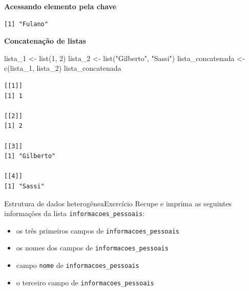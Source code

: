 \documentclass[
  10pt,
  ignorenonframetext,
]{beamer}
\newenvironment{Shaded}{\begin{snugshade}}{\end{snugshade}}
\newcommand{\DecValTok}[1]{\textcolor[rgb]{0.68,0.00,0.00}{#1}}
\newcommand{\FunctionTok}[1]{\textcolor[rgb]{0.28,0.35,0.67}{#1}}
\newcommand{\NormalTok}[1]{\textcolor[rgb]{0.00,0.23,0.31}{#1}}
\newcommand{\OtherTok}[1]{\textcolor[rgb]{0.00,0.23,0.31}{#1}}
\newcommand{\SpecialCharTok}[1]{\textcolor[rgb]{0.37,0.37,0.37}{#1}}
\newcommand{\StringTok}[1]{\textcolor[rgb]{0.13,0.47,0.30}{#1}}
\providecommand{\tightlist}{%
  \setlength{\itemsep}{0pt}\setlength{\parskip}{0pt}}\usepackage{longtable,booktabs,array}
\begin{document}
\begin{frame}[fragile]
\textbf{Acessando elemento pela chave}

\begin{Shaded}
\end{Shaded}

\begin{verbatim}
[1] "Fulano"
\end{verbatim}

\textbf{Concatenação de listas}

\begin{Shaded}
\begin{Highlighting}[]
\NormalTok{lista\_1 }\OtherTok{\textless{}{-}} \FunctionTok{list}\NormalTok{(}\DecValTok{1}\NormalTok{, }\DecValTok{2}\NormalTok{)}
\NormalTok{lista\_2 }\OtherTok{\textless{}{-}} \FunctionTok{list}\NormalTok{(}\StringTok{"Gilberto"}\NormalTok{, }\StringTok{"Sassi"}\NormalTok{)}
\NormalTok{lista\_concatenada }\OtherTok{\textless{}{-}} \FunctionTok{c}\NormalTok{(lista\_1, lista\_2)}
\NormalTok{lista\_concatenada}
\end{Highlighting}
\end{Shaded}

\begin{verbatim}
[[1]]
[1] 1

[[2]]
[1] 2

[[3]]
[1] "Gilberto"

[[4]]
[1] "Sassi"
\end{verbatim}
\end{frame}

\begin{frame}[fragile]{Estrutura de dados heterogênea\newline Exercício}
\protect\hypertarget{estrutura-de-dados-heteroguxeaneaexercuxedcio-1}{}
Recupe e imprima as seguintes informações da lista
\texttt{informacoes\_pessoais}:

\begin{itemize}
\tightlist
\item
  os três primeiros campos de \texttt{informacoes\_pessoais}
\item
  os nomes dos campos de \texttt{informacoes\_pessoais}
\item
  campo \texttt{nome} de \texttt{informacoes\_pessoais}
\item
  o terceiro campo de \texttt{informacoes\_pessoais}
\end{itemize}
\end{frame}
\end{document}
